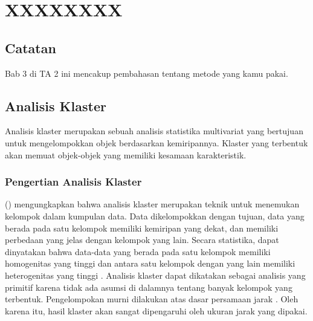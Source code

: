 \chapter{XXXXXXXX}

\section{Catatan}
Bab 3 di TA 2 ini mencakup pembahasan tentang metode yang kamu pakai.

\section{Analisis Klaster}
Analisis klaster merupakan sebuah analisis statistika multivariat yang bertujuan untuk mengelompokkan objek berdasarkan kemiripannya. Klaster yang terbentuk akan memuat objek-objek yang memiliki kesamaan karakteristik.

\subsection{Pengertian Analisis Klaster}
\citeauthor{kaufman} (\citeyear{kaufman}) mengungkapkan bahwa analisis klaster merupakan teknik untuk menemukan kelompok dalam kumpulan data. Data dikelompokkan dengan tujuan, data yang berada pada satu kelompok memiliki kemiripan yang dekat, dan memiliki perbedaan yang jelas dengan kelompok yang lain. Secara statistika, dapat dinyatakan bahwa data-data yang berada pada satu kelompok memiliki homogenitas yang tinggi dan antara satu kelompok dengan yang lain memiliki heterogenitas yang tinggi \citep{hair}. Analisis klaster dapat dikatakan sebagai analisis yang primitif karena tidak ada asumsi di dalamnya tentang banyak kelompok yang terbentuk. Pengelompokan murni dilakukan atas dasar persamaan jarak \citep{johnsonwichern}. Oleh karena itu, hasil klaster akan sangat dipengaruhi oleh ukuran jarak yang dipakai.

